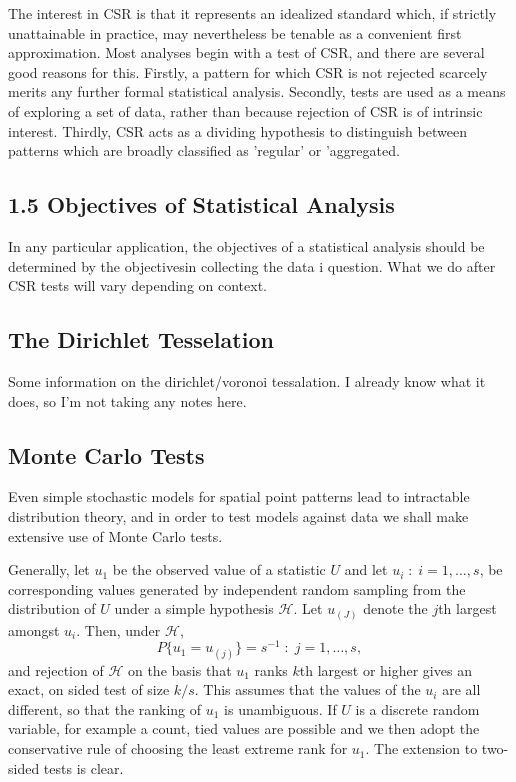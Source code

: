 \documentclass{article}
\begin{document}
The interest in CSR is that it represents an idealized standard which, if strictly unattainable in practice, may nevertheless be tenable as a convenient first approximation. Most analyses begin with a test of CSR, and there are several good reasons for this. Firstly, a pattern for which CSR is not rejected scarcely merits any further formal statistical analysis. Secondly, tests are used as a means of exploring a set of data, rather than because rejection of CSR is of intrinsic interest. Thirdly, CSR acts as a dividing hypothesis to distinguish between patterns which are broadly classified as 'regular' or 'aggregated. 
\subsection*{1.5 Objectives of Statistical Analysis}
In any particular application, the objectives of a statistical analysis should be determined by the objectivesin collecting the data i question. What we do after CSR tests will vary depending on context. 
\subsection*{The Dirichlet Tesselation}
Some information on the dirichlet/voronoi tessalation. I already know what it does, so I'm not taking any notes here.
\subsection*{Monte Carlo Tests}
Even simple stochastic models for spatial point patterns lead to intractable distribution theory, and in order to test models against data we shall make extensive use of Monte Carlo tests.

Generally, let $u_1$ be the observed value of a statistic $U$ and let $u_i \; : \; i = 1, \dots, s$, be corresponding values generated by independent random sampling from the distribution of $U$ under a simple hypothesis $\mathcal{H}$. Let $u_{(J)}$ denote the $j$th largest amongst $u_i$. Then, under $\mathcal{H}$, $$P\{u_1 = u_{(j)}\} = s^{-1} \; : \; j = 1, \dots, s,$$ and rejection of $\mathcal{H}$ on the basis that $u_1$ ranks $k$th largest or higher gives an exact, on sided test of size $k/s$. This assumes that the values of the $u_i$ are all different, so that the ranking of $u_1$ is unambiguous. If $U$ is a discrete random variable, for example a count, tied values are possible and we then adopt the conservative rule of choosing the least extreme rank for $u_1$. The extension to two-sided tests is clear. 
\end{document}
